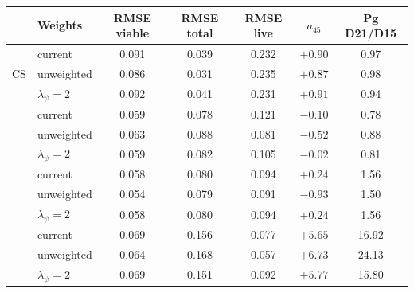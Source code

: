 \begin{tabular}{@{}llccccc@{}}
\toprule
 & Weights & RMSE viable & RMSE total & RMSE live & $a_{45}$ & Pg D21/D15\\
\midrule
\multirow{3}{*}{CS} & current & 0.091 & 0.039 & 0.232 & $+0.90$ & 0.97\\
 & unweighted & 0.086 & 0.031 & 0.235 & $+0.87$ & 0.98\\
 & $\lambda_\psi=2$ & 0.092 & 0.041 & 0.231 & $+0.91$ & 0.94\\
\addlinespace
\multirow{3}{*}{CH} & current & 0.059 & 0.078 & 0.121 & $-0.10$ & 0.78\\
 & unweighted & 0.063 & 0.088 & 0.081 & $-0.52$ & 0.88\\
 & $\lambda_\psi=2$ & 0.059 & 0.082 & 0.105 & $-0.02$ & 0.81\\
\addlinespace
\multirow{3}{*}{DS} & current & 0.058 & 0.080 & 0.094 & $+0.24$ & 1.56\\
 & unweighted & 0.054 & 0.079 & 0.091 & $-0.93$ & 1.50\\
 & $\lambda_\psi=2$ & 0.058 & 0.080 & 0.094 & $+0.24$ & 1.56\\
\addlinespace
\multirow{3}{*}{DH} & current & 0.069 & 0.156 & 0.077 & $+5.65$ & 16.92\\
 & unweighted & 0.064 & 0.168 & 0.057 & $+6.73$ & 24.13\\
 & $\lambda_\psi=2$ & 0.069 & 0.151 & 0.092 & $+5.77$ & 15.80\\
\bottomrule
\end{tabular}
